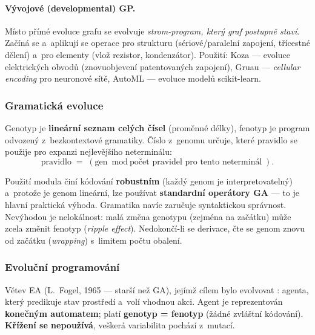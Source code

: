 \documentclass[11pt,a4paper]{article}
\theoremstyle{definition}
\begin{document}
\paragraph{Vývojové (developmental) GP.} Místo přímé evoluce grafu se
evolvuje \emph{strom-program, který graf postupně staví}. Začíná se
 a~aplikují se operace pro strukturu (sériové/paralelní zapojení,
třícestné dělení) a~pro elementy (vlož rezistor, kondenzátor). Použití:
Koza --- evoluce elektrických obvodů (znovuobjevení patentovaných zapojení),
Gruau --- \emph{cellular encoding} pro neuronové sítě, AutoML --- evoluce
modelů scikit-learn.

\subsubsection{Gramatická evoluce}

\begin{defbox}
Genotyp je \textbf{lineární seznam celých čísel} (proměnné délky), fenotyp je program
odvozený z~bezkontextové gramatiky. Číslo z~genomu určuje, které pravidlo se použije pro
expanzi nejlevějšího neterminálu:
\[
\text{pravidlo} \;=\; (\text{gen} \bmod \text{počet pravidel pro tento neterminál}).
\]
\end{defbox}

Použití modula činí kódování \textbf{robustním} (každý genom je interpretovatelný)
a~protože je genom lineární, lze používat \textbf{standardní operátory GA} --- to je hlavní
praktická výhoda. Gramatika navíc zaručuje syntaktickou správnost. Nevýhodou je nelokálnost:
malá změna genotypu (zejména na začátku) může zcela změnit fenotyp (\emph{ripple effect}).
Nedokončí-li se derivace, čte se genom znovu od začátku (\emph{wrapping}) s~limitem počtu
obalení.

\subsubsection{Evoluční programování}

\begin{defbox}
Větev EA (L.~Fogel, 1965 --- starší než GA), jejímž cílem bylo evolvovat
: agenta, který predikuje stav prostředí a~volí vhodnou
akci. Agent je reprezentován \textbf{konečným automatem}; platí
\textbf{genotyp = fenotyp} (žádné zvláštní kódování).
\textbf{Křížení se nepoužívá}, veškerá variabilita pochází z~mutací.
\end{defbox}
\end{document}
